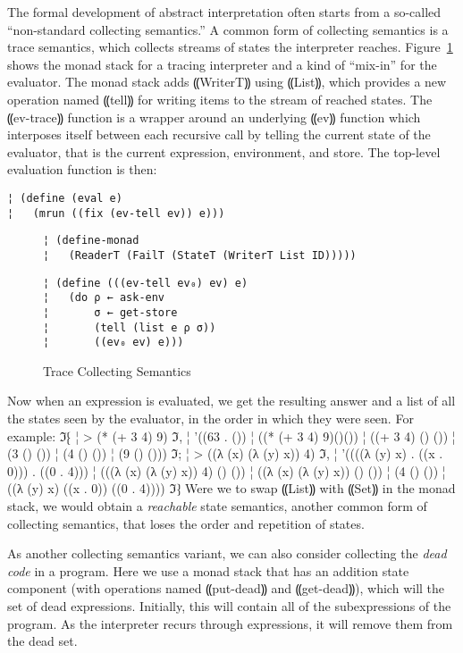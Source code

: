 The formal development of abstract interpretation often starts from a so-called
``non-standard collecting semantics.''  A common form of collecting semantics
is a trace semantics, which collects streams of states the interpreter reaches.
Figure~\ref{f:trace} shows the monad stack for a tracing interpreter and a kind
of ``mix-in'' for the evaluator.  The monad stack adds ⸨WriterT⸩ using ⸨List⸩,
which provides a new operation named ⸨tell⸩ for writing items to the stream of
reached states.  The ⸨ev-trace⸩ function is a wrapper around an underlying ⸨ev⸩
function which interposes itself between each recursive call by telling the
current state of the evaluator, that is the current expression, environment,
and store.  The top-level evaluation function is then:
\begin{lstlisting}
¦ (define (eval e) 
¦   (mrun ((fix (ev-tell ev)) e)))
\end{lstlisting}

\begin{figure}
\begin{lstlisting}
¦ (define-monad
¦   (ReaderT (FailT (StateT (WriterT List ID)))))
\end{lstlisting}
\figskip{}
\begin{lstlisting}
¦ (define (((ev-tell ev₀) ev) e)
¦   (do ρ ← ask-env
¦       σ ← get-store
¦       (tell (list e ρ σ))
¦       ((ev₀ ev) e)))
\end{lstlisting}
\caption{Trace Collecting Semantics}
\label{f:trace}
\end{figure}

Now when an expression is evaluated, we get the resulting answer and a list of
all the states seen by the evaluator, in the order in which they were seen. For
example:
ℑ⁅
¦ > (* (+ 3 4) 9)
ℑ,
¦ '((63 . ())
¦   ((* (+ 3 4) 9)()())
¦   ((+ 3 4) () ())
¦   (3 () ())
¦   (4 () ())
¦   (9 () ()))
ℑ;
¦ > ((λ (x) (λ (y) x)) 4)
ℑ,
¦ '((((λ (y) x) . ((x . 0))) . ((0 . 4)))
¦   (((λ (x) (λ (y) x)) 4) () ())
¦   ((λ (x) (λ (y) x)) () ())
¦   (4 () ())
¦   ((λ (y) x) ((x . 0)) ((0 . 4))))
ℑ⁆
Were we to swap ⸨List⸩ with ⸨Set⸩ in the monad stack, we would obtain a
\emph{reachable} state semantics, another common form of collecting semantics,
that loses the order and repetition of states.

As another collecting semantics variant, we can also consider collecting the
\emph{dead code} in a program.  Here we use a monad stack that has an addition
state component (with operations named ⸨put-dead⸩ and ⸨get-dead⸩), which will
the set of dead expressions.  Initially, this will contain all of the
subexpressions of the program.  As the interpreter recurs through expressions,
it will remove them from the dead set.

